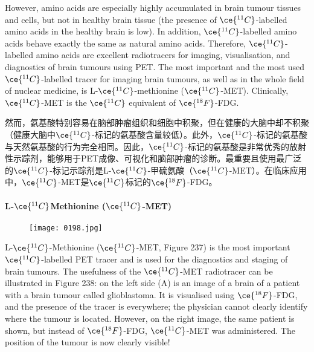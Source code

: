 \documentclass[dvipsnames, svgnames,a4paper,11pt]{article}
\begin{document}
However, amino acids are especially highly accumulated in brain tumour tissues and cells, but not in healthy brain tissue (the presence of \(\ce{^{11}C}\)-labelled amino acids in the healthy brain is low). In addition, \(\ce{^{11}C}\)-labelled amino acids behave exactly the same as natural amino acids. Therefore, \(\ce{^{11}C}\)-labelled amino acids are excellent radiotracers for imaging, visualisation, and diagnostics of brain tumours using PET. The most important and the most used \(\ce{^{11}C}\)-labelled tracer for imaging brain tumours, as well as in the whole field of nuclear medicine, is L-\(\ce{^{11}C}\)-methionine (\(\ce{^{11}C}\)-MET). Clinically, \(\ce{^{11}C}\)-MET is the \(\ce{^{11}C}\) equivalent of \(\ce{^{18}F}\)-FDG.


然而，氨基酸特别容易在脑部肿瘤组织和细胞中积聚，但在健康的大脑中却不积聚（健康大脑中\(\ce{^{11}C}\)-标记的氨基酸含量较低）。此外，\(\ce{^{11}C}\)-标记的氨基酸与天然氨基酸的行为完全相同。因此，\(\ce{^{11}C}\)-标记的氨基酸是非常优秀的放射性示踪剂，能够用于PET成像、可视化和脑部肿瘤的诊断。最重要且使用最广泛的\(\ce{^{11}C}\)-标记示踪剂是L-\(\ce{^{11}C}\)-甲硫氨酸（\(\ce{^{11}C}\)-MET）。在临床应用中，\(\ce{^{11}C}\)-MET是\(\ce{^{11}C}\)标记的\(\ce{^{18}F}\)-FDG。

\paragraph{L-\(\ce{^{11}C}\)Methionine (\(\ce{^{11}C}\)-MET) } 

\begin{wrapfigure}{r}{0.4\textwidth}
    \centering
    \texttt{[image: 0198.jpg]}
     \label{fig237}
\end{wrapfigure}

L-\(\ce{^{11}C}\)-Methionine (\(\ce{^{11}C}\)-MET, Figure 237) is the most important \(\ce{^{11}C}\)-labelled PET tracer and is used for the diagnostics and staging of brain tumours. The usefulness of the \(\ce{^{11}C}\)-MET radiotracer can be illustrated in Figure 238: on the left side (A) is an image of a brain of a patient with a brain tumour called glioblastoma. It is visualised using \(\ce{^{18}F}\)-FDG, and the presence of the tracer is everywhere; the physician cannot clearly identify where the tumour is located. However, on the right image, the same patient is shown, but instead of \(\ce{^{18}F}\)-FDG, \(\ce{^{11}C}\)-MET was administered. The position of the tumour is now clearly visible!
\end{document}
